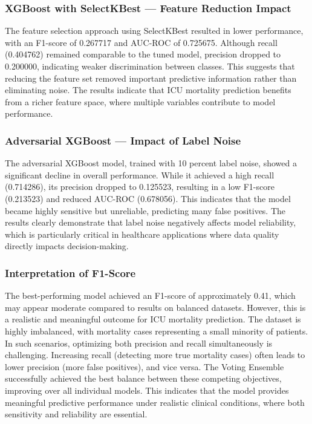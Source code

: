 \documentclass[11pt]{article}
\begin{document}
\subsubsection{XGBoost with SelectKBest — Feature Reduction Impact
}
The feature selection approach using SelectKBest resulted in lower performance, with an F1-score of 0.267717 and AUC-ROC of 0.725675. Although recall (0.404762) remained comparable to the tuned model, precision dropped to 0.200000, indicating weaker discrimination between classes.
This suggests that reducing the feature set removed important predictive information rather than eliminating noise. The results indicate that ICU mortality prediction benefits from a richer feature space, where multiple variables contribute to model performance.

\subsubsection{Adversarial XGBoost — Impact of Label Noise
}

The adversarial XGBoost model, trained with 10 percent label noise, showed a significant decline in overall performance. While it achieved a high recall (0.714286), its precision dropped to 0.125523, resulting in a low F1-score (0.213523) and reduced AUC-ROC (0.678056).
This indicates that the model became highly sensitive but unreliable, predicting many false positives. The results clearly demonstrate that label noise negatively affects model reliability, which is particularly critical in healthcare applications where data quality directly impacts decision-making.

\subsubsection{Interpretation of F1-Score
}

The best-performing model achieved an F1-score of approximately 0.41, which may appear moderate compared to results on balanced datasets. However, this is a realistic and meaningful outcome for ICU mortality prediction.
The dataset is highly imbalanced, with mortality cases representing a small minority of patients. In such scenarios, optimizing both precision and recall simultaneously is challenging. Increasing recall (detecting more true mortality cases) often leads to lower precision (more false positives), and vice versa.
The Voting Ensemble successfully achieved the best balance between these competing objectives, improving over all individual models. This indicates that the model provides meaningful predictive performance under realistic clinical conditions, where both sensitivity and reliability are essential.
\end{document}
